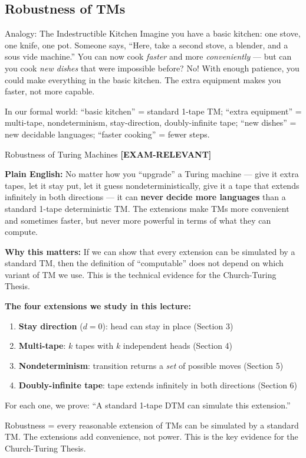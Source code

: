 \documentclass[11pt,a4paper]{article}
\newcommand{\kemark}{\textcolor{red!70!black}{\textbf{[EXAM-RELEVANT]}}}
\newcommand{\kt}[1]{\par\vspace{0.3em}\colorbox{yellow!60}{\parbox{\dimexpr\linewidth-2\fboxsep}{#1}}\vspace{0.3em}}
\begin{document}
\subsection{Robustness of TMs} \label{sec:robustness}

\begin{notebox}{Analogy: The Indestructible Kitchen}
Imagine you have a basic kitchen: one stove, one knife, one pot. Someone says, ``Here, take a second stove, a blender, and a sous vide machine.'' You can now cook \textit{faster} and more \textit{conveniently} --- but can you cook \textit{new dishes} that were impossible before? No! With enough patience, you could make everything in the basic kitchen. The extra equipment makes you faster, not more capable.

In our formal world: ``basic kitchen'' = standard 1-tape TM; ``extra equipment'' = multi-tape, nondeterminism, stay-direction, doubly-infinite tape; ``new dishes'' = new decidable languages; ``faster cooking'' = fewer steps.
\end{notebox}

\begin{conceptbox}{Robustness of Turing Machines \kemark}

\textbf{Plain English:}
No matter how you ``upgrade'' a Turing machine --- give it extra tapes, let it stay put, let it guess nondeterministically, give it a tape that extends infinitely in both directions --- it can \textbf{never decide more languages} than a standard 1-tape deterministic TM. The extensions make TMs more convenient and sometimes faster, but never more powerful in terms of what they can compute.

\textbf{Why this matters:}
If we can show that every extension can be simulated by a standard TM, then the definition of ``computable'' does not depend on which variant of TM we use. This is the technical evidence for the Church-Turing Thesis.

\textbf{The four extensions we study in this lecture:}
\begin{enumerate}[nosep]
\item \textbf{Stay direction} ($d = 0$): head can stay in place (Section 3)
\item \textbf{Multi-tape}: $k$ tapes with $k$ independent heads (Section 4)
\item \textbf{Nondeterminism}: transition returns a \textit{set} of possible moves (Section 5)
\item \textbf{Doubly-infinite tape}: tape extends infinitely in both directions (Section 6)
\end{enumerate}

For each one, we prove: ``A standard 1-tape DTM can simulate this extension.''

\kt{Robustness = every reasonable extension of TMs can be simulated by a standard TM. The extensions add convenience, not power. This is the key evidence for the Church-Turing Thesis.}
\end{conceptbox}
\end{document}
